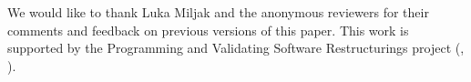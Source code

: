 \begin{acks}
  We would like to thank Luka Miljak and the anonymous reviewers for their comments and feedback on previous versions of this paper.
  This work is supported by the Programming and Validating Software Restructurings project (, ).
\end{acks}
